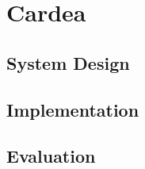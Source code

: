 \chapter{Cardea}\label{sec-cardea}

\section{System Design}

\section{Implementation}

\section{Evaluation}

\newpage
